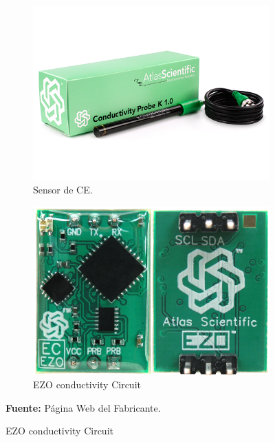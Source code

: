 \begin{figure}[H]
\caption[Sensor y EZO de CE.]{Sensor y EZO de CE de la empresa Atlas Scientific. }
     \centering
     \begin{subfigure}[b]{0.6\textwidth}
         \centering
         \includegraphics[width=\textwidth]{Imagenes/2021/imag24.png}
        \caption[Sensor de CE]{Sensor de CE.  }
        \label{fig:sensorCE}
     \end{subfigure}
     \hfill
     \begin{subfigure}[b]{0.3\textwidth}
         \centering
         \includegraphics[width=\textwidth]{Imagenes/2021/imag28.png}
        \caption[EZO conductivity Circuit]{EZO conductivity Circuit}
        \label{fig:EZOCE}
     \end{subfigure}
     {\textbf{Fuente:} P\'agina Web del Fabricante\cite{atlasph}.}
     \hfill
\end{figure}

